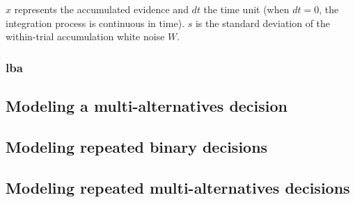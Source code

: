 $x$ represents the accumulated evidence and $dt$ the time unit (when $dt = 0$, the integration process is continuous in time). $s$ is the standard deviation of the within-trial accumulation white noise $W$.

\subsubsection{\acrlong{lba}}

\subsection{Modeling a multi-alternatives decision}

\subsection{Modeling repeated binary decisions}

\subsection{Modeling repeated multi-alternatives decisions}